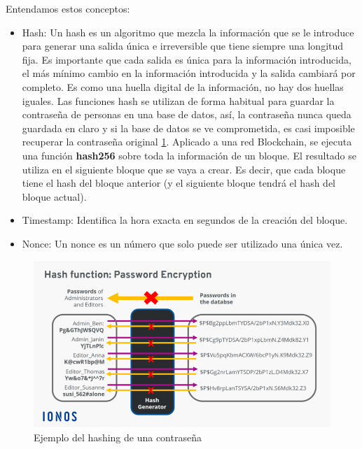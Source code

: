 Entendamos estos conceptos:
\begin{itemize}
  \item Hash: Un hash\cite{whatIsHash} es un algoritmo que mezcla la información que se le introduce para generar una salida única e irreversible que tiene siempre una longitud fija. Es importante que cada salida es única para la información introducida, el más mínimo cambio en la información introducida y la salida cambiará por completo. Es como una huella digital de la información, no hay dos huellas iguales. Las funciones hash se utilizan de forma habitual para guardar la contraseña de personas en una base de datos, así, la contraseña nunca queda guardada en claro y si la base de datos se ve comprometida, es casi imposible recuperar la contraseña original \ref{fig:hash}. Aplicado a una red Blockchain, se ejecuta una función \textbf{hash256} sobre toda la información de un bloque. El resultado se utiliza en el siguiente bloque que se vaya a crear. Es decir, que cada bloque tiene el hash del bloque anterior (y el siguiente bloque tendrá el hash del bloque actual). 
  \item Timestamp: Identifica la hora exacta en segundos de la creación del bloque.
  \item Nonce: Un nonce\cite{whatIsNonce} es un número que solo puede ser utilizado una única vez. 
\end{itemize}

\begin{figure}[h!]
  \centering
  \includegraphics[width=0.8\linewidth]{figs/EstadoArte/Blockchain/hash}
  \caption[Ejemplo del hashing de una contraseña]{Ejemplo del hashing de una contraseña}
  \label{fig:hash}
\end{figure}

